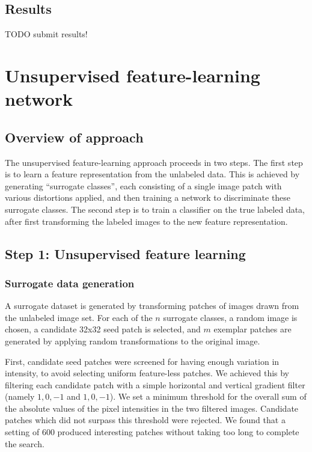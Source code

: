 \documentclass{article} %
\begin{document}
\subsection{Results}

TODO submit results!

\section{Unsupervised feature-learning network}
\subsection{Overview of approach}

The unsupervised feature-learning approach proceeds in two steps. The first step is to learn a feature representation from the unlabeled data. This is achieved by generating ``surrogate classes'', each consisting of a single image patch with various distortions applied, and then training a network to discriminate these surrogate classes. The second step is to train a classifier on the true labeled data, after first transforming the labeled images to the new feature representation.

\subsection{Step 1: Unsupervised feature learning}

\subsubsection{Surrogate data generation}

A surrogate dataset is generated by transforming patches of images drawn from the unlabeled image set. For each of the $n$ surrogate classes, a random image is chosen, a candidate 32x32 seed patch is selected, and $m$ exemplar patches are generated by applying random transformations to the original image.

First, candidate seed patches were screened for having enough variation in intensity, to avoid selecting uniform feature-less patches. We achieved this by filtering each candidate patch with a simple horizontal and vertical gradient filter (namely ${{1, 0, -1}}$ and ${{1},{0},{-1}}$). We set a minimum threshold for the overall sum of the absolute values of the pixel intensities in the two filtered images. Candidate patches which did not surpass this threshold were rejected. We found that a setting of $600$ produced interesting patches without taking too long to complete the search. 
\end{document}

